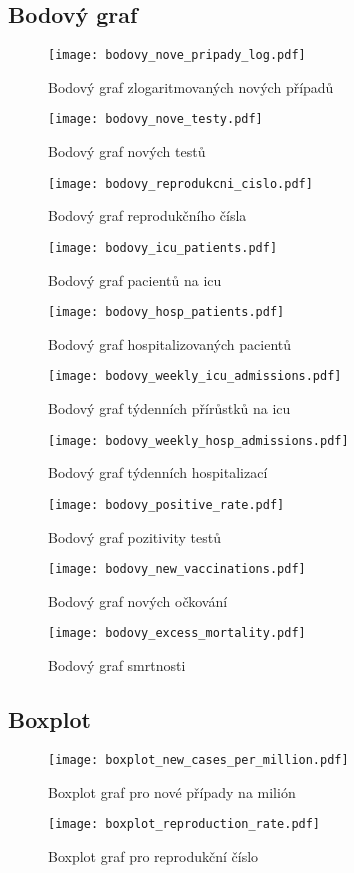 \documentclass[a4paper]{ article}
\begin{document}
\subsection{Bodový graf}
\begin{figure}[H]
\centering

\texttt{[image: bodovy\_nove\_pripady\_log.pdf]}
\caption{Bodový graf zlogaritmovaných nových případů}

\texttt{[image: bodovy\_nove\_testy.pdf]}
\caption{Bodový graf nových testů}

\end{figure}
\begin{figure}[H]
\centering

\texttt{[image: bodovy\_reprodukcni\_cislo.pdf]}
\caption{Bodový graf reprodukčního čísla}

\texttt{[image: bodovy\_icu\_patients.pdf]}
\caption{Bodový graf pacientů na icu}

\end{figure}
\begin{figure}[H]
\centering

\texttt{[image: bodovy\_hosp\_patients.pdf]}
\caption{Bodový graf hospitalizovaných pacientů}

\texttt{[image: bodovy\_weekly\_icu\_admissions.pdf]}
\caption{Bodový graf týdenních přírůstků na icu}

\end{figure}
\begin{figure}[H]
\centering

\texttt{[image: bodovy\_weekly\_hosp\_admissions.pdf]}
\caption{Bodový graf týdenních hospitalizací}

\texttt{[image: bodovy\_positive\_rate.pdf]}
\caption{Bodový graf pozitivity testů}

\end{figure}
\begin{figure}[H]
\centering

\texttt{[image: bodovy\_new\_vaccinations.pdf]}
\caption{Bodový graf nových očkování}

\texttt{[image: bodovy\_excess\_mortality.pdf]}
\caption{Bodový graf smrtnosti}

\end{figure}
\subsection{Boxplot}
\begin{figure}[H]
\centering

\texttt{[image: boxplot\_new\_cases\_per\_million.pdf]}
\caption{Boxplot graf pro nové případy na milión}

\texttt{[image: boxplot\_reproduction\_rate.pdf]}
\caption{Boxplot graf pro reprodukční číslo}
\end{figure}
\end{document}
